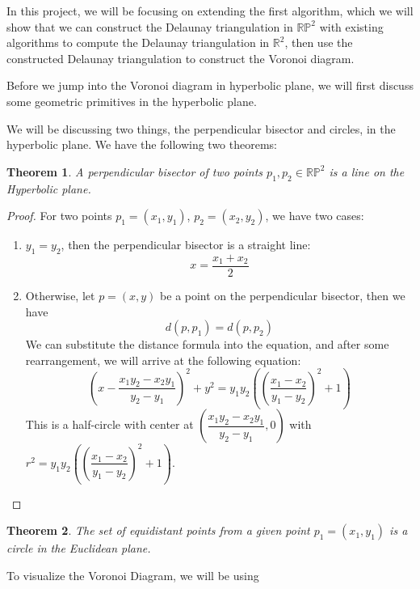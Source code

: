 \documentclass[minted, draw]{hebdomon}
\newcommand{\R}{{\mathbb{R} }}
\newcommand{\RP}{{\mathbb{R}\mathbb{P} }}
\newtheorem{theorem}{Theorem}
\begin{document}
In this project, we will be focusing on extending the first algorithm, which we will show that we can construct the Delaunay triangulation in $\RP^2$ with existing algorithms to compute the Delaunay triangulation in $\R^2$, then use the constructed Delaunay triangulation to construct the Voronoi diagram.



Before we jump into the Voronoi diagram in hyperbolic plane, we will first discuss some geometric primitives in the hyperbolic plane. 

We will be discussing two things, the perpendicular bisector and circles, in the hyperbolic plane. We have the following two theorems:

\begin{theorem}
    A perpendicular bisector of two points $p_1, p_2 \in \RP^2$ is a line on the Hyperbolic plane. 
\end{theorem}

\begin{proof}
    For two points $p_1 = (x_1, y_1)$, $p_2 = (x_2, y_2)$, we have two cases:
    \begin{enumerate}
        \item $y_1 = y_2$, then the perpendicular bisector is a straight line:
        \[
        x = \frac{x_1 + x_2}{2}
        \]
        \item Otherwise, let $p = (x,y)$ be a point on the perpendicular bisector, then we have
        \[
            d(p, p_1) = d(p, p_2)
        \]
        We can substitute the distance formula into the equation, and after some rearrangement, we will arrive at the following equation:
        \[
        \left (x-\dfrac{x_1y_2-x_2y_1}{y_2-y_1} \right)^2 + y^2 = y_1y_2 \left ( \left ( \dfrac{x_1-x_2}{y_1-y_2}\right )^2 + 1 \right )
        \]
        This is a half-circle with center at $\left (\dfrac{x_1y_2-x_2y_1}{y_2-y_1}, 0 \right)$ with $r^2 = y_1y_2 \left ( \left ( \dfrac{x_1-x_2}{y_1-y_2}\right )^2 + 1 \right )$.
    \end{enumerate}
\end{proof}

\begin{theorem}
    The set of equidistant points from a given point $p_1 = (x_1, y_1)$ is a circle in the Euclidean plane.
\end{theorem}






To visualize the Voronoi Diagram, we will be using


\end{document}
